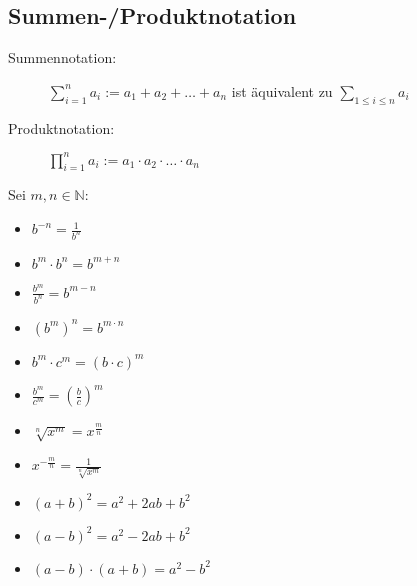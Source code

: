 \subsection*{Summen-/Produktnotation}
\begin{description}
  \item [Summennotation:]
    $\sum_{i=1}^{n}a_i := a_1 + a_2 + \dots + a_n$ ist äquivalent zu 
    $\sum_{1\leq i\leq n}^{}a_i$

  \item [Produktnotation:]
    $\prod_{i=1}^{n}a_i := a_1 \cdot a_2 \cdot \dots \cdot a_n$
\end{description}

\begin{framed} 
  Sei $m,n \in \mathbb{N}:$
  \begin{itemize}
    \item $b^{-n} = \frac{1}{b^n}$
    \item $b^m \cdot b^n = b^{m+n}$
    \item $\frac{b^m}{b^n} = b^{m-n}$
    \item $(b^m)^n = b^{m\cdot n}$
    \item $b^m \cdot c^m = (b\cdot c)^m$
    \item $\frac{b^m}{c^m} = (\frac{b}{c})^m$
    \item $\sqrt[n]{x^m} = x^\frac{m}{n}$
    \item $x^{-\frac{m}{n}} = \frac{1}{\sqrt[n]{x^m}}$
  \end{itemize}
\end{framed}

\begin{framed} 
  \begin{itemize}
    \item $(a + b)^2 = a^2 + 2ab + b^2$
    \item $(a - b)^2 = a^2 - 2ab + b^2$
    \item $(a - b) \cdot (a + b) = a^2 - b^2$
  \end{itemize}		
\end{framed}
  

